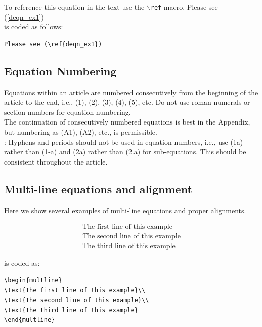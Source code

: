 \documentclass[lettersize,journal]{IEEEtran}
\begin{document}
To reference this equation in the text use the $\backslash${\tt{ref}} macro.
Please see (\ref{deqn_ex1})\\
\noindent is coded as follows:
\begin{verbatim}
Please see (\ref{deqn_ex1})\end{verbatim}

\subsection{Equation Numbering}
 Equations within an article are numbered consecutively from the beginning of the
article to the end, i.e., (1), (2), (3), (4), (5), etc. Do not use roman numerals or section numbers for equation numbering.\\

 The continuation of consecutively numbered equations is best in the Appendix, but numbering
 as (A1), (A2), etc., is permissible.\\

: Hyphens and periods should not be used in equation numbers, i.e., use (1a) rather than
(1-a) and (2a) rather than (2.a) for sub-equations. This should be consistent throughout the article.

\subsection{Multi-line equations and alignment}
\noindent Here we show several examples of multi-line equations and proper alignments.

\begin{multline}
\text{The first line of this example}\\
\text{The second line of this example}\\
\text{The third line of this example}
\end{multline}

\noindent is coded as:
\begin{verbatim}
\begin{multline}
\text{The first line of this example}\\
\text{The second line of this example}\\
\text{The third line of this example}
\end{multline}
\end{verbatim}
\end{document}
